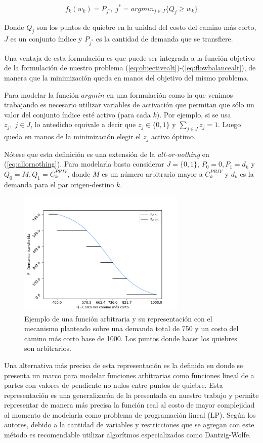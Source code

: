 \begin{equation}
  \label{eq:deffks}
  f_k(w_k) = P_{j^*},\; j^* = argmin_{j \in J} \{Q_j \geq w_k\}
\end{equation}

Donde $Q_j$ son los puntos de quiebre en la unidad del costo del camino más corto, $J$ es un conjunto índice y $P_{j^*}$ es la cantidad de demanda que se transfiere.

Una ventaja de esta formulación es que puede ser integrada a la función objetivo de la formulación de nuestro problema (\ref{eq:objectivealt})-(\ref{eq:flowbalancealt}), de manera que la minimización queda en manos del objetivo del mismo problema.

Para modelar la función $argmin$ en una formulación como la que venimos trabajando es necesario utilizar variables de activación que permitan que sólo un valor del conjunto índice esté activo (para cada $k$). Por ejemplo, si se usa $z_j,\; j \in J$, lo antedicho equivale a decir que $z_j \in \{0,1\}$ y $\sum_{j \in J} z_j = 1$. Luego queda en manos de la minimización elegir el $z_j$ activo óptimo.

Nótese que esta definición es una extensión de la {\it all-or-nothing} en (\ref{eq:allornothing}). Para modelarla basta considerar $J = \{0, 1\}$, $P_0 = 0, P_1 = d_k$ y $Q_0 = M, Q_1 = C^{PRIV}_k$, donde $M$ es un número arbitrario mayor a $C^{PRIV}_k$ y $d_k$ es la demanda para el par origen-destino $k$.

\begin{figure}[h!]
  \centering
  \includegraphics[width=8cm]{../resources/f_example.png}
  \caption{Ejemplo de una función arbitraria y su representación con el mecanismo planteado sobre una demanda total de 750 y un costo del camino más corto base de 1000. Los puntos donde hacer los quiebres son arbitrarios.}
  \label{fig:fdrawexample}
\end{figure}

Una alternativa más precisa de esta representación es la definida en \cite{Crainic2021} donde se presenta un marco para modelar funciones arbitrarias como funciones lineal de a partes con valores de pendiente no nulos entre puntos de quiebre. Esta representación es una generalizacón de la presentada en nuestro trabajo y permite representar de manera más precisa la función real al costo de mayor complejidad al momento de modelarla como problema de programación lineal (LP). Según los autores, debido a la cantidad de variables y restricciones que se agregan con este método es recomendable utilizar algorítmos especializados como Dantzig-Wolfe.


